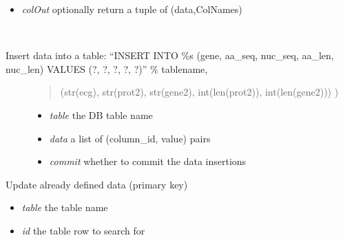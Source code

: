 \documentclass[a4paper,11pt,english]{sphinxmanual}
\begin{document}
\begin{fulllineitems}
\begin{fulllineitems}
\begin{itemize}
\item {} 
\emph{colOut} optionally return a tuple of (data,ColNames)

\end{itemize}

\end{fulllineitems}


\begin{fulllineitems}
\label{modules_doc:cbmpy.CBNetDB.DBTools.insertData}~\begin{description}
\item[{Insert data into a table: ``INSERT INTO \%s (gene, aa\_seq, nuc\_seq, aa\_len, nuc\_len) VALUES (?, ?, ?, ?, ?)'' \% tablename,}] \leavevmode\begin{quote}

(str(ecg), str(prot2), str(gene2), int(len(prot2)), int(len(gene2))) )
\end{quote}
\begin{itemize}
\item {} 
\emph{table} the DB table name

\item {} 
\emph{data} a list of (column\_id, value) pairs

\item {} 
\emph{commit} whether to commit the data insertions

\end{itemize}

\end{description}

\end{fulllineitems}


\begin{fulllineitems}
\label{modules_doc:cbmpy.CBNetDB.DBTools.updateData}
Update already defined data (primary key)
\begin{itemize}
\item {} 
\emph{table} the table name

\item {} 
\emph{id} the table row to search for

\end{itemize}

\end{fulllineitems}


\end{fulllineitems}
\end{document}
